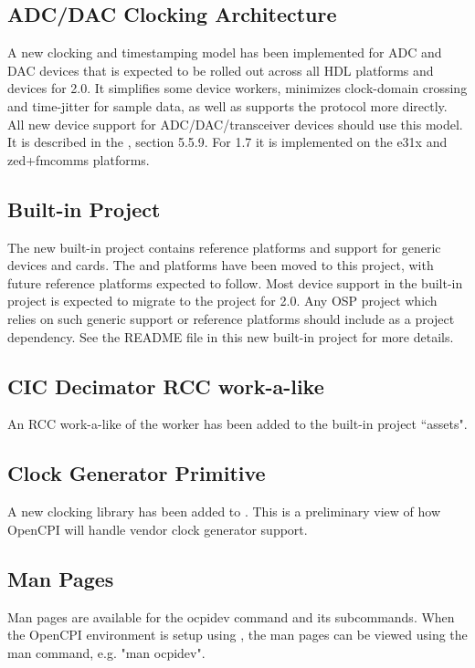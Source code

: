 \subsection{ADC/DAC Clocking Architecture}
\label{sec:17_adc_dac}
A new clocking and timestamping model has been implemented for ADC and DAC devices that is expected to be rolled out across all HDL platforms and devices for 2.0.  It simplifies some device workers, minimizes clock-domain crossing and time-jitter for sample data, as well as supports the  protocol more directly. All new device support for ADC/DAC/transceiver devices should use this model.  It is described in the , section 5.5.9.  For 1.7 it is implemented on the e31x and zed+fmcomms platforms.

\subsection{Built-in  Project}
\label{sec:17_platform_project}
The new built-in  project contains reference platforms and support for generic devices and cards. The  and  platforms have been moved to this project, with future reference platforms expected to follow. Most device support in the built-in  project is expected to migrate to the  project for 2.0. Any OSP project which relies on such generic support or reference platforms should include  as a project dependency. See the README file in this new built-in project for more details.

\subsection{CIC Decimator RCC work-a-like}
\label{sec17_cic_dec}
An RCC work-a-like of the  worker has been added to the built-in project ``assets".

\subsection{Clock Generator Primitive}
\label{sec:17_clocking}
A new clocking library has been added to . This is a preliminary view of how OpenCPI will handle vendor clock generator support.

\subsection{Man Pages}
\label{sec:17_man_pages}
Man pages are available for the ocpidev command and its subcommands. When the OpenCPI environment is setup using , the man pages can be viewed using the man command, e.g. "man ocpidev".


